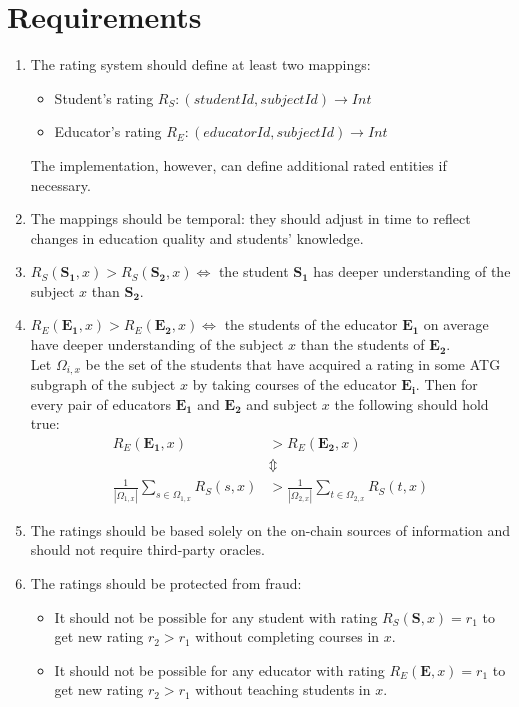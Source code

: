 \documentclass[a4paper]{article}
\begin{document}
\section*{Requirements}
\begin{enumerate}
  \item The rating system should define at least two mappings:
    \begin{itemize}
      \item Student's rating $R_S: (studentId, subjectId) \rightarrow Int$
      \item Educator's rating $R_E: (educatorId, subjectId) \rightarrow Int$
    \end{itemize}
    The implementation, however, can define additional rated entities if necessary.
  \item The mappings should be temporal: they should adjust in time to reflect changes in education quality and students' knowledge.
  \item $R_S(\mathbf{S_1}, x) > R_S(\mathbf{S_2}, x) \iff$ the student $\mathbf{S_1}$ has deeper understanding of the subject $x$ than $\mathbf{S_2}$.
  \item $R_E(\mathbf{E_1}, x) > R_E(\mathbf{E_2}, x) \iff$ the students of the educator $\mathbf{E_1}$ on average have deeper understanding of the subject $x$ than the students of $\mathbf{E_2}$. \\ Let $\Omega_{i, x}$ be the set of the students that have acquired a rating in some ATG subgraph of the subject $x$ by taking courses of the educator $\mathbf{E_i}$. Then for every pair of educators $\mathbf{E_1}$ and $\mathbf{E_2}$ and subject $x$ the following should hold true:
    \begin{align*}
      R_E(\mathbf{E_1}, x) &> R_E(\mathbf{E_2}, x) \\
      &\Updownarrow\\
      \frac{1}{|\Omega_{1, x}|} \sum_{s \in \Omega_{1, x}} R_S(s, x) &>
      \frac{1}{|\Omega_{2, x}|} \sum_{t \in \Omega_{2, x}} R_S(t, x)
    \end{align*}
  \item The ratings should be based solely on the on-chain sources of information and should not require third-party oracles.
  \item The ratings should be protected from fraud:
  \begin{itemize}
  	\item It should not be possible for any student with rating $R_S(\mathbf{S}, x) = r_1$ to get new rating $r_2 > r_1$ without completing courses in $x$.
  	\item It should not be possible for any educator with rating $R_E(\mathbf{E}, x) = r_1$ to get new rating $r_2 > r_1$ without teaching students in $x$.
  \end{itemize}

\end{enumerate}
\end{document}
